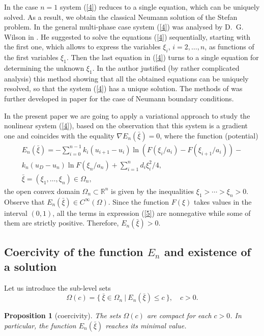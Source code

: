 \documentclass[10pt,a4paper]{amsart}
\newtheorem{proposition}{Proposition}[section]
\numberwithin{equation}{section}
\newcommand{\R}{{\mathbb R}}
\begin{document}
In the case $n=1$ system (\ref{4}) reduces to a single equation, which can be uniquely solved. As a result, we obtain the classical Neumann solution of the Stefan problem.
In the general multi-phase case system (\ref{4}) was analysed by D.~G. Wilson in \cite{Wil}. He suggested
to solve the equations (\ref{4}) sequentially, starting with the first one, which allows to express the variables
$\xi_i$, $i=2,\ldots,n$, as functions of the first variables $\xi_1$. Then the last equation in (\ref{4}) turns to a single equation for determining the unknown $\xi_1$. In \cite{Wil} the author justified (by rather complicated analysis) this method showing that all the obtained  equations can be uniquely resolved, so that the system (\ref{4}) has a unique solution. The methods of \cite{Wil} was further developed in paper \cite{ST} for the case of Neumann boundary conditions.

In the present paper we are going to apply a variational approach to study the nonlinear system (\ref{4}), based on the observation that this system is a gradient one and coincides with the equality
$\nabla E_n(\bar\xi)=0$, where the function (potential)
\begin{align}\label{5}
E_n(\bar\xi)=-\sum_{i=0}^{n-1}  k_i(u_{i+1}-u_i)\ln (F(\xi_i/a_i)-F(\xi_{i+1}/a_i))-\nonumber\\  k_n(u_D-u_n)\ln F(\xi_n/a_n)+\sum_{i=1}^n d_i\xi_i^2/4, \\ \nonumber \bar\xi=(\xi_1,\ldots,\xi_n)\in\Omega_n,
\end{align}
the open convex domain $\Omega_n\subset\R^n$ is given by the inequalities $\xi_1>\cdots>\xi_n>0$.
Observe that $E_n(\bar\xi)\in C^\infty(\Omega)$. Since the function $F(\xi)$ takes values in the interval $(0,1)$, all the terms in expression (\ref{5}) are nonnegative while some of them are strictly positive. Therefore, $E_n(\bar\xi)>0$.

\subsection{Coercivity of the function $E_n$ and existence of a solution}

Let us introduce the sub-level sets \[\Omega(c)=\{ \ \bar\xi\in\Omega_n \ | \ E_n(\bar\xi)\le c \ \}, \quad c>0.\]

\begin{proposition}[coercivity]\label{th1}
The sets $\Omega(c)$ are compact for each $c>0$.
In particular, the function $E_n(\bar\xi)$ reaches its minimal value.
\end{proposition}
\end{document}
